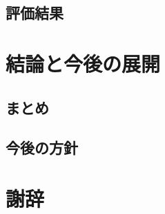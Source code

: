\documentclass{funthesis}
\begin{document}
\section{評価結果}



\chapter{結論と今後の展開}

\section{まとめ}




\section{今後の方針}



\chapter*{謝辞}
\end{document}
